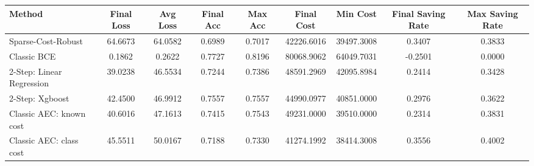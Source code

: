 \begin{tabular}{lcccccccc}
\toprule
Method & Final Loss & Avg Loss & Final Acc & Max Acc & Final Cost & Min Cost & Final Saving Rate & Max Saving Rate \\
\midrule
Sparse-Cost-Robust & 64.6673 & 64.0582 & 0.6989 & 0.7017 & 42226.6016 & 39497.3008 & 0.3407 & 0.3833 \\
Classic BCE & 0.1862 & 0.2622 & 0.7727 & 0.8196 & 80068.9062 & 64049.7031 & -0.2501 & 0.0000 \\
2-Step: Linear Regression & 39.0238 & 46.5534 & 0.7244 & 0.7386 & 48591.2969 & 42095.8984 & 0.2414 & 0.3428 \\
2-Step: Xgboost & 42.4500 & 46.9912 & 0.7557 & 0.7557 & 44990.0977 & 40851.0000 & 0.2976 & 0.3622 \\
Classic AEC: known cost & 40.6016 & 47.1613 & 0.7415 & 0.7543 & 49231.0000 & 39510.0000 & 0.2314 & 0.3831 \\
Classic AEC: class cost & 45.5511 & 50.0167 & 0.7188 & 0.7330 & 41274.1992 & 38414.3008 & 0.3556 & 0.4002 \\
\bottomrule
\end{tabular}
